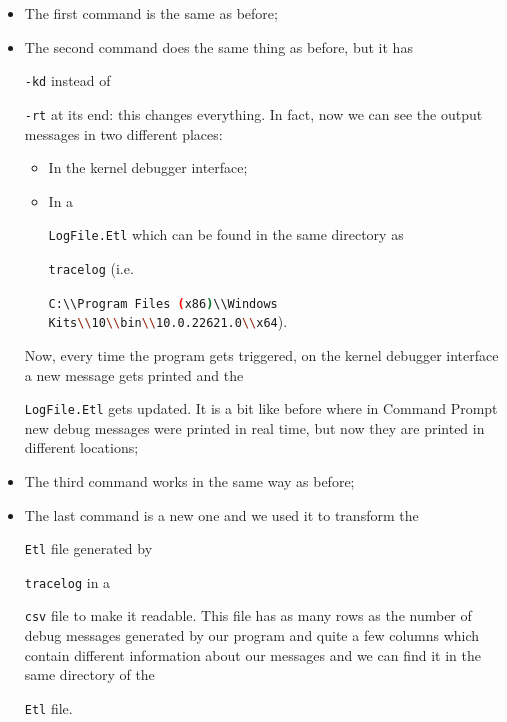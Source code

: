 \begin{itemize}
	\item 
		The first command is the same as before;
	\item 
		The second command does the same thing as before, but it has \raggedright\colorbox{backcolour}{\lstinline[style=commandline, language=bash]|-kd|} instead of \raggedright\colorbox{backcolour}{\lstinline[style=commandline, language=bash]|-rt|} at its end: this changes everything.
		In fact, now we can see the output messages in two different places:
		\begin{itemize}
			\item 
				In the kernel debugger interface;
			\item 
				In a \raggedright\colorbox{backcolour}{\lstinline[style=commandline, language=bash]|LogFile.Etl|} which can be found in the same directory as \raggedright\colorbox{backcolour}{\lstinline[style=commandline, language=bash]|tracelog|} (i.e. \raggedright\colorbox{backcolour}{\lstinline[style=commandline, language=bash]|C:\\Program Files (x86)\\Windows Kits\\10\\bin\\10.0.22621.0\\x64|}).
		\end{itemize}
		Now, every time the program gets triggered, on the kernel debugger interface a new message gets printed and the \raggedright\colorbox{backcolour}{\lstinline[style=commandline, language=bash]|LogFile.Etl|} gets updated.
		It is a bit like before where in Command Prompt new debug messages were printed in real time, but now they are printed in different locations;
	\item 
		The third command works in the same way as before;
	\item 
		The last command is a new one and we used it to transform the \raggedright\colorbox{backcolour}{\lstinline[style=commandline, language=bash]|Etl|} file generated by \raggedright\colorbox{backcolour}{\lstinline[style=commandline, language=bash]|tracelog|} in a \raggedright\colorbox{backcolour}{\lstinline[style=commandline, language=bash]|csv|} file to make it readable.
		This file has as many rows as the number of debug messages generated by our program and quite a few columns which contain different information about our messages and we can find it in the same directory of the \raggedright\colorbox{backcolour}{\lstinline[style=commandline, language=bash]|Etl|} file.
\end{itemize}

